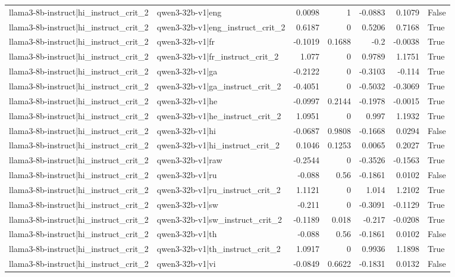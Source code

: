 \begin{table}
\begin{tabular}{l l r r r r l}
llama3-8b-instruct|hi_instruct_crit_2 & qwen3-32b-v1|eng & 0.0098 & 1 & -0.0883 & 0.1079 & False \\
llama3-8b-instruct|hi_instruct_crit_2 & qwen3-32b-v1|eng_instruct_crit_2 & 0.6187 & 0 & 0.5206 & 0.7168 & True \\
llama3-8b-instruct|hi_instruct_crit_2 & qwen3-32b-v1|fr & -0.1019 & 0.1688 & -0.2 & -0.0038 & True \\
llama3-8b-instruct|hi_instruct_crit_2 & qwen3-32b-v1|fr_instruct_crit_2 & 1.077 & 0 & 0.9789 & 1.1751 & True \\
llama3-8b-instruct|hi_instruct_crit_2 & qwen3-32b-v1|ga & -0.2122 & 0 & -0.3103 & -0.114 & True \\
llama3-8b-instruct|hi_instruct_crit_2 & qwen3-32b-v1|ga_instruct_crit_2 & -0.4051 & 0 & -0.5032 & -0.3069 & True \\
llama3-8b-instruct|hi_instruct_crit_2 & qwen3-32b-v1|he & -0.0997 & 0.2144 & -0.1978 & -0.0015 & True \\
llama3-8b-instruct|hi_instruct_crit_2 & qwen3-32b-v1|he_instruct_crit_2 & 1.0951 & 0 & 0.997 & 1.1932 & True \\
llama3-8b-instruct|hi_instruct_crit_2 & qwen3-32b-v1|hi & -0.0687 & 0.9808 & -0.1668 & 0.0294 & False \\
llama3-8b-instruct|hi_instruct_crit_2 & qwen3-32b-v1|hi_instruct_crit_2 & 0.1046 & 0.1253 & 0.0065 & 0.2027 & True \\
llama3-8b-instruct|hi_instruct_crit_2 & qwen3-32b-v1|raw & -0.2544 & 0 & -0.3526 & -0.1563 & True \\
llama3-8b-instruct|hi_instruct_crit_2 & qwen3-32b-v1|ru & -0.088 & 0.56 & -0.1861 & 0.0102 & False \\
llama3-8b-instruct|hi_instruct_crit_2 & qwen3-32b-v1|ru_instruct_crit_2 & 1.1121 & 0 & 1.014 & 1.2102 & True \\
llama3-8b-instruct|hi_instruct_crit_2 & qwen3-32b-v1|sw & -0.211 & 0 & -0.3091 & -0.1129 & True \\
llama3-8b-instruct|hi_instruct_crit_2 & qwen3-32b-v1|sw_instruct_crit_2 & -0.1189 & 0.018 & -0.217 & -0.0208 & True \\
llama3-8b-instruct|hi_instruct_crit_2 & qwen3-32b-v1|th & -0.088 & 0.56 & -0.1861 & 0.0102 & False \\
llama3-8b-instruct|hi_instruct_crit_2 & qwen3-32b-v1|th_instruct_crit_2 & 1.0917 & 0 & 0.9936 & 1.1898 & True \\
llama3-8b-instruct|hi_instruct_crit_2 & qwen3-32b-v1|vi & -0.0849 & 0.6622 & -0.1831 & 0.0132 & False \\

\end{tabular}
\end{table}

